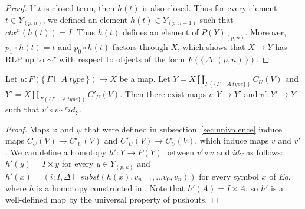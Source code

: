 \documentclass{mscs}
\numberwithin{figure}{section}
\begin{document}
\begin{proof}
If $t$ is closed term, then $h(t)$ is also closed.
Thus for every element $t \in Y_{(p,n)}$, we defined an element $h(t) \in Y_{(p,n+1)}$ such that $ctx^n(h(t)) = I$.
Thus $h(t)$ defines an element of $P(Y)_{(p,n)}$.
Moreover, $p_1 \circ h(t) = t$ and $p_0 \circ h(t)$ factors through $X$,
which shows that $X \to Y$ has RLP up to $\sim^r$ with respect to objects of the form $F(\{\,\Delta : (p,n)\,\})$.
\end{proof}

\begin{lem}[Jhom]
Let $u : F(\{\,\Gamma \vdash A\ type\,\}) \to X$ be a map.
Let $Y = X \amalg_{F(\{ \Gamma \vdash A\ type \})} C_U(V)$ and $Y' = X \amalg_{F(\{ \Gamma \vdash A\ type \})} C'_U(V)$.
Then there exist maps $v : Y \to Y'$ and $v' : Y' \to Y$ such that $v' \circ v \sim^r id_Y$.
\end{lem}
\begin{proof}
Maps $\varphi$ and $\psi$ that were defined in subsection~\ref{sec:univalence} induce maps $C_U(V) \to C'_U(V)$ and $C'_U(V) \to C_U(V)$, which induce maps $v$ and $v'$.
We can define a homotopy $h' : Y \to P(Y)$ between $v' \circ v$ and $id_Y$ as follows: $h'(y) = I \times y$ for every $y \in Y_{(p,k)}$
and $h'(x) = (i : I, \Delta \vdash subst(h(x), v_{n-1}, \ldots v_0, v_n))$ for every symbol $x$ of $Eq$,
where $h$ is a homotopy constructed in .
Note that $h'(A) = I \times A$, so $h'$ is a well-defined map by the universal property of pushouts.
\end{proof}
\end{document}
